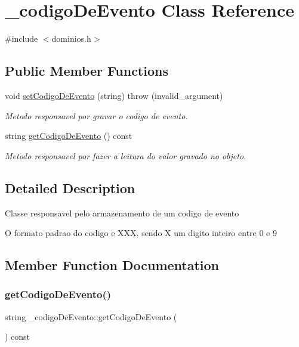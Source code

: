 \hypertarget{class__codigo_de_evento}{}\section{\+\_\+codigo\+De\+Evento Class Reference}
\label{class__codigo_de_evento}


{\ttfamily \#include $<$dominios.\+h$>$}

\subsection*{Public Member Functions}
\begin{DoxyCompactItemize}
\item 
void \mbox{\hyperlink{class__codigo_de_evento_a48417f2b849fbefa042af1235f6314ab}{set\+Codigo\+De\+Evento}} (string)  throw (invalid\+\_\+argument)
\begin{DoxyCompactList}\small\item\em Metodo responsavel por gravar o codigo de evento. \end{DoxyCompactList}\item 
string \mbox{\hyperlink{class__codigo_de_evento_a1d4255cd0bc4771530fb285fb4642bf7}{get\+Codigo\+De\+Evento}} () const
\begin{DoxyCompactList}\small\item\em Metodo responsavel por fazer a leitura do valor gravado no objeto. \end{DoxyCompactList}\end{DoxyCompactItemize}


\subsection{Detailed Description}
Classe responsavel pelo armazenamento de um codigo de evento

O formato padrao do codigo e X\+XX, sendo X um digito inteiro entre 0 e 9 

\subsection{Member Function Documentation}
\mbox{\label{class__codigo_de_evento_a1d4255cd0bc4771530fb285fb4642bf7}} 
\subsubsection{\texorpdfstring{getCodigoDeEvento()}{getCodigoDeEvento()}}
{\footnotesize\ttfamily string \+\_\+codigo\+De\+Evento\+::get\+Codigo\+De\+Evento (\begin{DoxyParamCaption}{ }\end{DoxyParamCaption}) const\hspace{0.3cm}{\ttfamily [inline]}}



